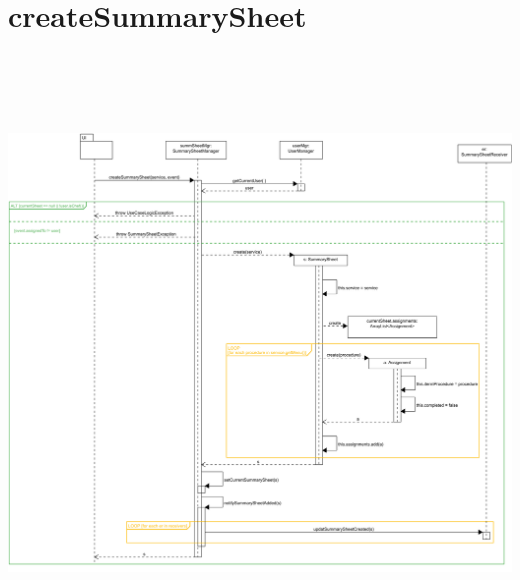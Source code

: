 \section{createSummarySheet}
\centering\includegraphics[max width=\textwidth, max height=158mm]{../resources/img/GCC/DSD/op1.png}


